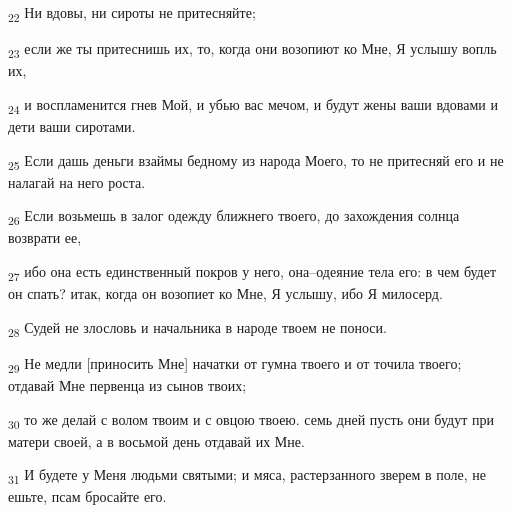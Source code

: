 \begin{tcolorbox}
\textsubscript{22} Ни вдовы, ни сироты не притесняйте;
\end{tcolorbox}
\begin{tcolorbox}
\textsubscript{23} если же ты притеснишь их, то, когда они возопиют ко Мне, Я услышу вопль их,
\end{tcolorbox}
\begin{tcolorbox}
\textsubscript{24} и воспламенится гнев Мой, и убью вас мечом, и будут жены ваши вдовами и дети ваши сиротами.
\end{tcolorbox}
\begin{tcolorbox}
\textsubscript{25} Если дашь деньги взаймы бедному из народа Моего, то не притесняй его и не налагай на него роста.
\end{tcolorbox}
\begin{tcolorbox}
\textsubscript{26} Если возьмешь в залог одежду ближнего твоего, до захождения солнца возврати ее,
\end{tcolorbox}
\begin{tcolorbox}
\textsubscript{27} ибо она есть единственный покров у него, она--одеяние тела его: в чем будет он спать? итак, когда он возопиет ко Мне, Я услышу, ибо Я милосерд.
\end{tcolorbox}
\begin{tcolorbox}
\textsubscript{28} Судей не злословь и начальника в народе твоем не поноси.
\end{tcolorbox}
\begin{tcolorbox}
\textsubscript{29} Не медли [приносить Мне] начатки от гумна твоего и от точила твоего; отдавай Мне первенца из сынов твоих;
\end{tcolorbox}
\begin{tcolorbox}
\textsubscript{30} то же делай с волом твоим и с овцою твоею. семь дней пусть они будут при матери своей, а в восьмой день отдавай их Мне.
\end{tcolorbox}
\begin{tcolorbox}
\textsubscript{31} И будете у Меня людьми святыми; и мяса, растерзанного зверем в поле, не ешьте, псам бросайте его.
\end{tcolorbox}
